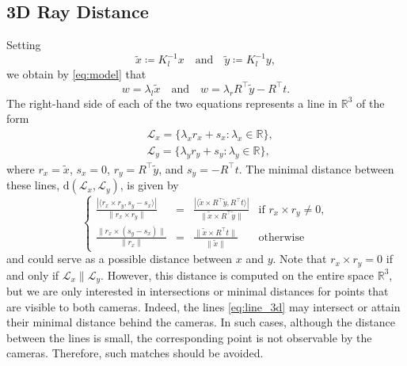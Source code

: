\documentclass[10pt, twocolumn]{article}
\theoremstyle{definition}
\newcommand{\R}{{\ensuremath{\mathbb{R}}}}
\begin{document}
\subsection{3D Ray Distance}\label{sec:ray}
Setting 
$$
\tilde x \coloneqq K_l^{-1} x 
\quad \text{and} \quad
\tilde y \coloneqq K_l^{-1} y,
$$
we obtain by \eqref{eq:model} that
\begin{equation} \label{eq:lines}
        w = \lambda_l \tilde x 
        \quad \text{and} \quad
        w = \lambda_r R^\top \tilde y - R^\top t.
\end{equation} 
The right-hand side of each of the two equations represents a line in 
$\R^3$ 
of the form 
\begin{equation} \label{eq:line_3d}
\begin{aligned}
&\mathcal L_x
=
\{\lambda_x r_x + s_x: \lambda_x\in\R\},
\\ 
&\mathcal L_y
=
\{\lambda_y r_y + s_y: \lambda_y\in\R\},
\end{aligned}
\end{equation}
where $r_x=\tilde x$, $s_x=0$, $r_y=R^\top\tilde y$, and
$s_y=-R^\top t$.
The minimal distance between these lines, $\text{d}(\mathcal L_x,\mathcal L_y)$, is given by
\begin{equation} 
 \left\{
\begin{array}{lcll}
\frac{|\langle r_x\times r_y, s_y-s_x\rangle|}{\|r_x\times r_y\|}
&=&
\frac{|\langle \tilde x\times R^\top\tilde y, R^\top t\rangle|}{\|\tilde x\times R^\top\tilde y\|}
&\text{if }r_x\times r_y\neq0,\\[1ex]
\frac{\|r_x\times (s_y-s_x)\|}{\|r_x\|}
&=&
\frac{\|\tilde x\times R^\top t\|}{\|\tilde x\|}
&\text{otherwise } 
\end{array}
\right.
\end{equation}
and could serve as a possible distance between $x$ and $y$. Note that $r_x \times r_y = 0$ if and only if 
$\mathcal L_x \parallel \mathcal L_y$.
However, this distance is computed on the entire space $\mathbb{R}^3$, but
we are only interested in intersections or minimal distances for points that are visible to both cameras.
Indeed, the lines \eqref{eq:line_3d} may intersect or attain their minimal distance behind the cameras. In such cases, although the distance between the lines is small, the corresponding point is not observable by the cameras. Therefore, such matches should be avoided. 
\end{document}
